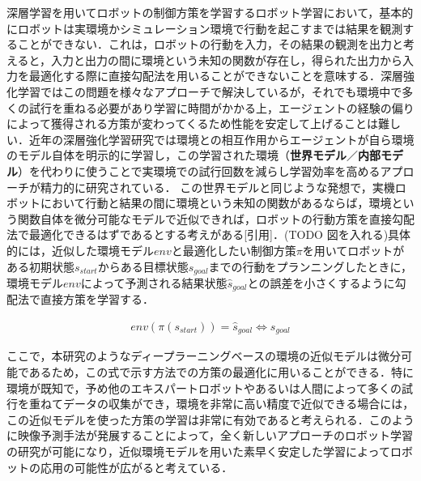   深層学習を用いてロボットの制御方策を学習するロボット学習において，基本的にロボットは実環境かシミュレーション環境で行動を起こすまでは結果を観測することができない．これは，ロボットの行動を入力，その結果の観測を出力と考えると，入力と出力の間に環境という未知の関数が存在し，得られた出力から入力を最適化する際に直接勾配法を用いることができないことを意味する．深層強化学習ではこの問題を様々なアプローチで解決しているが，それでも環境中で多くの試行を重ねる必要があり学習に時間がかかる上，エージェントの経験の偏りによって獲得される方策が変わってくるため性能を安定して上げることは難しい．近年の深層強化学習研究では環境との相互作用からエージェントが自ら環境のモデル自体を明示的に学習し，この学習された環境（{\bf 世界モデル}／{\bf 内部モデル}）を代わりに使うことで実環境での試行回数を減らし学習効率を高めるアプローチが精力的に研究されている．
  この世界モデルと同じような発想で，実機ロボットにおいて行動と結果の間に環境という未知の関数があるならば，環境という関数自体を微分可能なモデルで近似できれば，ロボットの行動方策を直接勾配法で最適化できるはずであるとする考えがある[引用]．(TODO 図を入れる)具体的には，近似した環境モデル$env$と最適化したい制御方策$\pi$を用いてロボットがある初期状態$s_{start}$からある目標状態$s_{goal}$までの行動をプランニングしたときに，環境モデル$env$によって予測される結果状態$\hat{s}_{goal}$との誤差を小さくするように勾配法で直接方策を学習する．

  \begin{eqnarray}
    env(\pi(s_{start})) = \hat{s}_{goal} \Leftrightarrow s_{goal} \nonumber
  \end{eqnarray}

  ここで，本研究のようなディープラーニングベースの環境の近似モデルは微分可能であるため，この式で示す方法での方策の最適化に用いることができる．特に環境が既知で，予め他のエキスパートロボットやあるいは人間によって多くの試行を重ねてデータの収集ができ，環境を非常に高い精度で近似できる場合には，この近似モデルを使った方策の学習は非常に有効であると考えられる．このように映像予測手法が発展することによって，全く新しいアプローチのロボット学習の研究が可能になり，近似環境モデルを用いた素早く安定した学習によってロボットの応用の可能性が広がると考えている．
  
  
